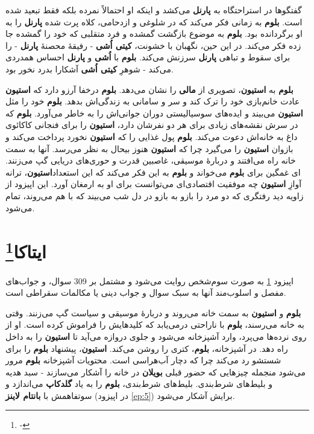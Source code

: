 \documentclass[12pt]{book}
\newcommand{\noun}[1]{{\textbf{#1}}}
\begin{document}
    گفتگوها در استراحتگاه به \noun{پارنل} می‌کشد و اینکه او احتمالاً نمرده بلکه فقط تبعید شده است. \noun{بلوم} به زمانی فکر می‌کند که در شلوغی و ازدحامی، کلاه پرت شده \noun{پارنل} را به او برگردانده بود. \noun{بلوم} به موضوع بازگشت گمشده و فرد متقلبی که خود را گمشده جا زده فکر می‌کند. در این حین، نگهبان با خشونت، \noun{کیتی اُشی} - رفیقهٔ محصنهٔ \noun{پارنل} - را برای سقوط و تباهی \noun{پارنل} سرزنش می‌کند. \noun{بلوم} با \noun{اُشی} و \noun{پارنل} احساس همدردی می‌کند - شوهرِ \noun{کیتی اُشی} آشکارا بدرد نخور بود.

    \noun{بلوم} به \noun{استیون}، تصویری از \noun{مالی} را نشان می‌دهد. \noun{بلوم} درخفا آرزو دارد که \noun{استیون} عادت خانم‌بازی خود را ترک کند و سر و سامانی به زندگی‌اش بدهد. \noun{بلوم} خود را مثل \noun{استیون} می‌بیند و ایده‌های سوسیالیستی دوران جوانی‌اش را به خاطر می‌آورد. \noun{بلوم} که در سرش نقشه‌های زیادی برای هر دو نفرشان دارد، \noun{استیون} را برای فنجانی کاکائوی داغ به خانه‌اش دعوت می‌کند. \noun{بلوم} پول غذایی را که \noun{استیون} نخورد پرداخت می‌کند و بازوان \noun{استیون} را می‌گیرد چرا که \noun{استیون} هنوز بیحال به نظر می‌رسد. آنها به سمت خانه راه می‌افتند و دربارهٔ موسیقی، غاصبین قدرت و حوری‌های دریایی گپ می‌زنند. \noun{استیون}، ترانه‎‌ای غمگین برای \noun{بلوم} می‌خواند و \noun{بلوم} به این فکر می‌کند که این استعداد آوازِ \noun{استیون} چه موفقیت اقتصادی‌ای می‌توانست برای او به ارمغان آورد. این اپیزود از زاویه دید رفتگری که دو مرد را بازو به بازو در دل شب می‌بیند که با هم می‌روند، تمام می‌شود.

    \chapter[ایتاکا]{ایتاکا\protect\footnote{-}}\label{ep:17}
    اپیزود \ref{ep:17} به صورت سوم‌شخص روایت می‌شود و مشتمل بر 309 سوال، و جواب‌های مفصل و اسلوب‌مند آنها به سبک سوال و جواب دینی یا مکالمات سقراطی است.

    \noun{بلوم} و \noun{استیون} به سمت خانه می‌روند و دربارهٔ موسیقی و سیاست گپ می‌زنند. وقتی به خانه می‌رسند، \noun{بلوم} با ناراحتی درمی‌یابد که کلیدهایش را فراموش کرده است. او از روی نرده‌ها می‌پرد، وارد آشپزخانه می‌شود و جلوی دروازه می‌آید تا \noun{استیون} را به داخل راه دهد. در آشپزخانه، \noun{بلوم}، کتری را روشن می‌کند. \noun{استیون}، پیشنهاد \noun{بلوم} را برای شستشو رد می‌کند چرا که دچار آب‌هراسی است. محتویات آشپزخانه \noun{بلوم} مرور می‌شود منجمله چیزهایی که حضور قبلی \noun{بویلان} در خانه را آشکار می‌سازند - سبد هدیه و بلیط‌های شرط‌بندی. بلیط‌های شرط‌بندی، \noun{بلوم} را به یاد \noun{گلدکاپ} می‌اندازد و سوتفاهمش با \noun{بانتام لاینز} (در اپیزود \ref{ep:5}) برایش آشکار می‌شود.
\end{document}
